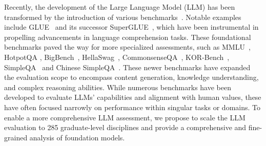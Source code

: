 Recently, the development of the Large Language Model (LLM) has been transformed by the introduction of various benchmarks~\citep{cobbe2021training,Wang2024MTUBenchAM,bai2024mt}. Notable examples include GLUE~\citep{DBLP:conf/iclr/WangSMHLB19} and its successor SuperGLUE~\citep{DBLP:conf/nips/WangPNSMHLB19}, which have been instrumental in propelling advancements in language comprehension tasks. These foundational benchmarks paved the way for more specialized assessments, such as MMLU~\citep{hendrycks2020measuring}, HotpotQA \citep{DBLP:conf/emnlp/Yang0ZBCSM18}, BigBench~\citep{DBLP:journals/corr/abs-2206-04615}, HellaSwag~\citep{DBLP:conf/acl/ZellersHBFC19},  CommonsenseQA~\citep{DBLP:conf/naacl/TalmorHLB19}, KOR-Bench~\citep{ma2024korbenchbenchmarkinglanguagemodels},
SimpleQA~\citep{simpleqa} and Chinese SimpleQA~\citep{csimpleqa}. These newer benchmarks have expanded the evaluation scope to encompass content generation, knowledge understanding, and complex reasoning abilities.
While numerous benchmarks have been developed to evaluate LLMs’ capabilities and alignment with human values, these have often focused narrowly on performance within singular
tasks or domains. 
To enable a more comprehensive LLM assessment,
we propose \benchmark to scale the LLM evaluation to 285 graduate-level disciplines and provide a comprehensive and fine-grained analysis of foundation models.


